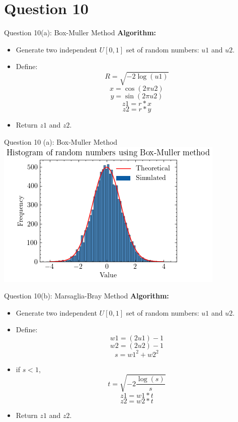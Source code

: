 \documentclass[compress,12pt]{beamer}
\begin{document}
\section{Question 10}
\begin{frame}{Question 10(a): Box-Muller Method}
    \textbf{Algorithm:}
    \begin{itemize}
        \item Generate two independent $U[0,1]$ set of random numbers: $u1$ and $u2$.
        \item Define:
        $$R=\sqrt{-2\log (u1)}$$
        $$x=\cos (2\pi u2)$$
        $$y=\sin (2\pi u2)$$
        $$z1=r*x$$
        $$z2=r*y$$
        \item Return $z1$ and $z2$.

    
    \end{itemize}
\end{frame}
\begin{frame}{Question 10 (a): Box-Muller Method}
\centering
\includegraphics[scale=0.7]{imgs/boxmuller.png}  
\end{frame}

\begin{frame}{Question 10(b): Marsaglia-Bray Method}
    \textbf{Algorithm:}
    \begin{itemize}
        \item Generate two independent $U[0,1]$ set of random numbers: $u1$ and $u2$.
        \item Define:
        $$w1=(2 u1)-1$$
        $$w2=(2 u2)-1$$
        $$s=w1^2+w2^2$$
        \item if $s<1$,
        $$t=\sqrt{-2\frac{\log(s)}{s}}$$
        $$z1=w1*t$$
        $$z2=w2*t$$
        \item Return $z1$ and $z2$.
    \end{itemize}
\end{frame}
\end{document}

